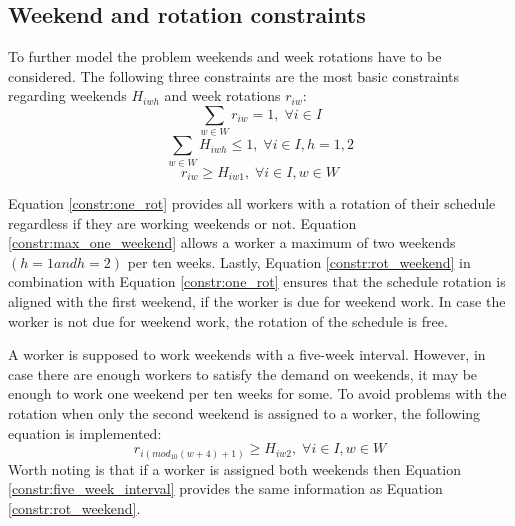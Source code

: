 \subsection{Weekend and rotation constraints} \label{section:weekend_rot_constraints}
To further model the problem weekends and week rotations have to be considered. The following three constraints are the most basic constraints regarding weekends $H_{iwh}$ and week rotations $r_{iw}$:
\begin{equation} \label{constr:one_rot}
\sum_{w \in W} r_{iw} = 1, \; \forall i\in I
\end{equation}
\begin{equation} \label{constr:max_one_weekend}
\sum_{w \in W} H_{iwh} \leq 1, \; \forall i\in I, h = 1,2
\end{equation}
\begin{equation} \label{constr:rot_weekend}
r_{iw} \geq H_{iw1}, \; \forall i\in I, w \in W
\end{equation}

Equation \ref{constr:one_rot} provides all workers with a rotation of their schedule regardless if they are working weekends or not. Equation \ref{constr:max_one_weekend} allows a worker a maximum of two weekends $(h = 1 and h = 2)$ per ten weeks. Lastly, Equation \ref{constr:rot_weekend} in combination with Equation \ref{constr:one_rot} ensures that the schedule rotation is aligned with the first weekend, if the worker is due for weekend work. In case the worker is not due for weekend work, the rotation of the schedule is free.

A worker is supposed to work weekends with a five-week interval. However, in case there are enough workers to satisfy the demand on weekends, it may be enough to work one weekend per ten weeks for some. To avoid problems with the rotation when only the second weekend is assigned to a worker, the following equation is implemented:
\begin{equation} \label{constr:five_week_interval}
r_{i(mod_{10}(w+4)+1)} \geq H_{iw2}, \; \forall i\in I, w \in W
\end{equation}
Worth noting is that if a worker is assigned both weekends then Equation \ref{constr:five_week_interval} provides the same information as Equation \ref{constr:rot_weekend}.

